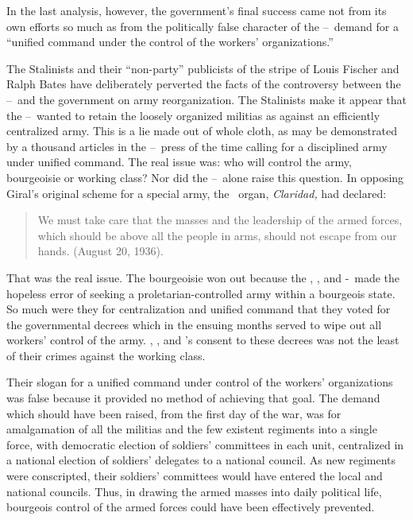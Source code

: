 In the last analysis, however, the government’s final success came not from its own efforts so much as from the politically false character of the \CNT--\POUM\ demand for a ``unified command under the control of the workers’ organizations.''

The Stalinists and their ``non-party'' publicists of the stripe of Louis Fischer and Ralph Bates have deliberately perverted the facts of the controversy between the \POUM--\CNT\ and the government on army reorganization. The Stalinists make it appear that the  \POUM--\CNT\ wanted to retain the loosely organized militias as against an efficiently centralized army. This is a lie made out of whole cloth, as may be demonstrated by a thousand articles in the \POUM--\CNT\ press of the time calling for a disciplined army under unified command. The real issue was: who will control the army, bourgeoisie or working class? Nor did the \POUM--\CNT\ alone raise this question. In opposing Giral’s original scheme for a special army, the \UGT\ organ, \emph{Claridad,} had declared:

\begin{quotation}
  We must take care that the masses and the leadership of the armed forces, which should be above all the people in arms, should not escape from our hands. (August 20, 1936).
\end{quotation}

That was the real issue. The bourgeoisie won out because the \UGT\kn, \POUM\kn, and \CNT-\FAI\ made the hopeless error of seeking a proletarian-controlled army within a bourgeois state. So much were they for centralization and unified command that they voted for the governmental decrees which in the ensuing months served to wipe out all workers’ control of the army. \UGT\kn, \POUM\kn, and \CNT's consent to these decrees was not the least of their crimes against the working class.

Their slogan for a unified command under control of the workers’ organizations was false because it provided no method of achieving that goal. The demand which should have been raised, from the first day of the war, was for amalgamation of all the militias and the few existent regiments into a single force, with democratic election of soldiers’ committees in each unit, centralized in a national election of soldiers’ delegates to a national council. As new regiments were conscripted, their soldiers’ committees would have entered the local and national councils. Thus, in drawing the armed masses into daily political life, bourgeois control of the armed forces could have been effectively prevented.

